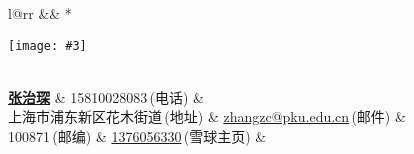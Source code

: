 \newcommand{\paint}[3]{
    \begin{minipage}{#1}
        \texttt{[image: \#3]}
    \end{minipage} 
}
\newcommand{\myheader}{
\begin{tabular*}{\textwidth}{l@{\extracolsep{\fill}}rr}
  && \multirow{4}*{\paint{2.6cm}{3.2cm}{./image.jpg}}\\
  \specialrule{0em}{4pt}{4pt}
  \textbf{\href{http://herechen.github.io}{\LARGE 张治琛}} & 15810028083$\,${\color{labelgrey}(电话)} &\\
  上海市浦东新区花木街道$\,${\color{labelgrey}(地址)} & \href{mailto:zhangzc@pku.edu.cn}{zhangzc@pku.edu.cn}$\,${\color{labelgrey}(邮件)} & \\
  100871$\,${\color{labelgrey}(邮编)} & \href{https://xueqiu.com/u/1376056330}{1376056330}$\,${\color{labelgrey}(雪球主页)} & \\
  \end{tabular*}\\\vspace{0.1in}
}

\myheader

